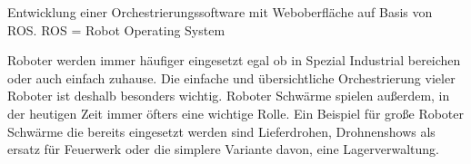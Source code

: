 \begin{flushleft}
    Entwicklung einer Orchestrierungssoftware mit Weboberfläche auf Basis von ROS.
    ROS = Robot Operating System

    Roboter werden immer häufiger eingesetzt egal ob in Spezial Industrial bereichen oder auch einfach zuhause.
    Die einfache und übersichtliche Orchestrierung vieler Roboter ist deshalb besonders wichtig.
    Roboter Schwärme spielen außerdem, in der heutigen Zeit immer öfters eine wichtige Rolle.
    Ein Beispiel für große Roboter Schwärme die bereits eingesetzt werden sind Lieferdrohen, Drohnenshows als 
    ersatz für Feuerwerk oder die simplere Variante davon, eine Lagerverwaltung.
\end{flushleft}